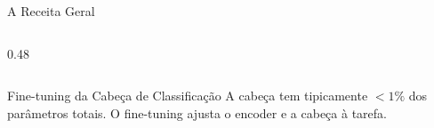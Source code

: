 \documentclass[aspectratio=169, xcolor=dvipsnames]{beamer}
\begin{document}
\begin{frame}{A Receita Geral}
\begin{columns}
\begin{column}{0.48\textwidth}
{}
      \end{column}
    \end{columns}
    \vspace{0.5em}
    \begin{exampleblock}{Fine-tuning da Cabeça de Classificação }
      A cabeça tem tipicamente \textbf{$ < 1\%$} dos parâmetros totais. O fine-tuning ajusta o encoder e a cabeça à tarefa.
    \end{exampleblock}
  \end{frame}
\end{document}

